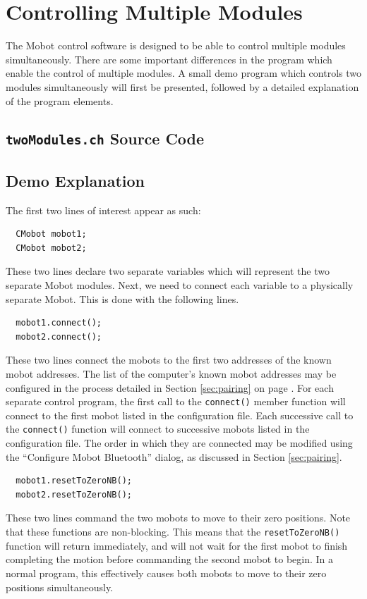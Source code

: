 \documentclass{article}
\begin{document}
\section{Controlling Multiple Modules}
The Mobot control software is designed to be able to control multiple modules
simultaneously. There are some important differences in the program 
which enable the control of multiple modules. A small demo program which
controls two modules simultaneously will first be presented, followed by
a detailed explanation of the program elements.

\subsection{\texttt{twoModules.ch} Source Code}


\subsection{Demo Explanation}
The first two lines of interest appear as such:
\begin{verbatim}
  CMobot mobot1;
  CMobot mobot2;
\end{verbatim}
These two lines declare two separate variables which will represent the
two separate Mobot modules. Next, we need to connect each variable to
a physically separate Mobot. This is done with the following lines.
\begin{verbatim}
  mobot1.connect();
  mobot2.connect();
\end{verbatim}
These two lines connect the mobots to the first two addresses
of the known mobot addresses. The list of the computer's known
mobot addresses may be configured in the process detailed in Section
\ref{sec:pairing} on page \pageref{sec:pairing}. For each separate
control program, the first call to the \texttt{connect()} member
function will connect to the first mobot listed in the configuration
file. Each successive call to the \texttt{connect()} function will
connect to successive mobots listed in the configuration file. 
The order in which they are connected may be modified using the
``Configure Mobot Bluetooth'' dialog, as discussed in Section
\ref{sec:pairing}.

\begin{verbatim}
  mobot1.resetToZeroNB();
  mobot2.resetToZeroNB();
\end{verbatim}
These two lines command the two mobots to move to their zero positions.
Note that these functions are non-blocking. This means that the
\texttt{resetToZeroNB()} function will return immediately, and will not
wait for the first mobot to finish completing the motion before 
commanding the second mobot to begin. In a normal program, this effectively
causes both mobots to move to their zero positions simultaneously.
\end{document}

